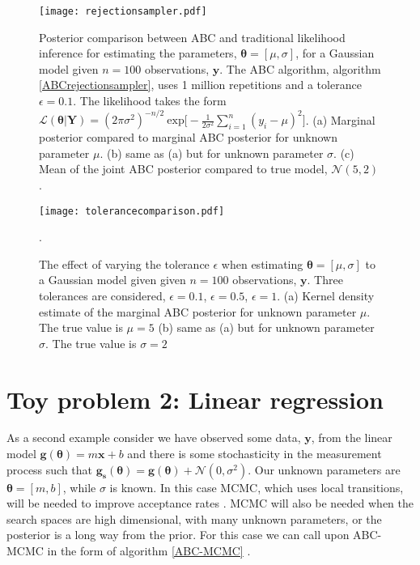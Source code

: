 \begin{figure}[H]
	\centering
	\texttt{[image: rejectionsampler.pdf]}
	\caption{Posterior comparison between ABC and traditional likelihood inference for estimating the parameters, $\bm{\theta} = [\mu,\sigma]$, for a Gaussian model given $n = 100$ observations, $\bm{y}$. The ABC algorithm, algorithm \ref{ABCrejectionsampler}, uses 1 million repetitions and a tolerance $\epsilon = 0.1$. The likelihood takes the form $\mathcal{L}(\bm{\theta}|\bm{Y}) = (2\pi\sigma^2)^{-n/2}\ \text{exp}\big[-\frac{1}{2\sigma^2}\sum_{i = 1}^{n}(y_i-\mu)^2\big]$. (a) Marginal posterior compared to marginal ABC posterior for unknown parameter $\mu$. (b) same as (a) but for unknown parameter $\sigma$. (c) Mean of the joint ABC posterior compared to true model, $\mathcal{N}(5,2)$.}
	\label{toy1-fig1}
\end{figure}

\begin{figure}[H]
	\centering
	\texttt{[image: tolerancecomparison.pdf]}
	\caption{The effect of varying the tolerance $\epsilon$ when estimating $\bm{\theta} = [\mu,\sigma]$ to a Gaussian model given given $n = 100$ observations, $\bm{y}$. Three tolerances are considered, $\epsilon = 0.1$, $\epsilon = 0.5$, $\epsilon = 1$. (a) Kernel density estimate of the marginal ABC posterior for unknown parameter $\mu$. The true value is $\mu = 5$ (b) same as (a) but for unknown parameter $\sigma$. The true value is $\sigma = 2$}.
	\label{toy1-fig2}
\end{figure}

\section{Toy problem 2: Linear regression}
\label{sec-lin-reg}

As a second example consider we have observed some data, $\bm{y}$, from the linear model $\bm{g}(\bm{\theta}) = m\bm{x} + b$ and there is some stochasticity in the measurement process such that $\bm{g_s}(\bm{\theta}) = \bm{g}(\bm{\theta}) + \mathcal{N}(0,\sigma^2)$. Our unknown parameters are $\bm{\theta} = [m,b]$, while $\sigma$ is known. In this case MCMC, which uses local transitions, will be needed to improve acceptance rates \citep{Gilks1995}. MCMC will also be needed when the search spaces are high dimensional, with many unknown parameters, or the posterior is a long way from the prior. For this case we can call upon ABC-MCMC in the form of algorithm \ref{ABC-MCMC} \citep{Marjoram2003,Sisson2010a}. \par

